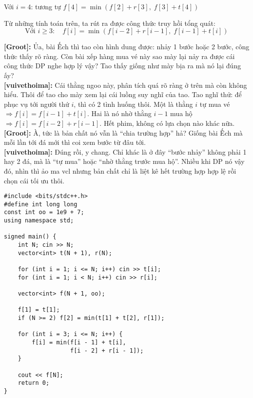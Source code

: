 Với $i = 4$: tương tự $f[4] = \min \left( f[2] + r[3], \; f[3] + t[4] \right)$

Từ những tính toán trên, ta rút ra được công thức truy hồi tổng quát:  
\[
\text{Với } i \geq 3: \quad f[i] = \min \left( f[i-2] + r[i-1], \; f[i-1] + t[i] \right)
\]


\textbf{[Groot]:} Ủa, bài Ếch thì tao còn hình dung được: nhảy 1 bước hoặc 2 bước, công thức thấy rõ ràng.  
Còn bài xếp hàng mua vé này sao mày lại nảy ra được cái công thức DP nghe hợp lý vậy? Tao thấy giống như mày bịa ra mà nó lại đúng ấy? \\

\textbf{[vuivethoima]:} Cái thằng ngoo này, phân tích quá rõ ràng ở trên mà còn không hiểu. Thôi để tao cho mày xem lại cái luồng suy nghĩ của tao. Tao nghĩ thử: để phục vụ tới người thứ $i$, thì có 2 tình huống thôi.  
Một là thằng $i$ tự mua vé $\Rightarrow f[i] = f[i-1] + t[i]$.  
Hai là nó nhờ thằng $i-1$ mua hộ $\Rightarrow f[i] = f[i-2] + r[i-1]$.  
Hết phim, không có lựa chọn nào khác nữa.\\

\textbf{[Groot]:} À, tức là bản chất nó vẫn là ``chia trường hợp'' hả? Giống bài Ếch mà mỗi lần tới đá mới thì coi xem bước từ đâu tới.\\

\textbf{[vuivethoima]:} Đúng rồi, y chang. Chỉ khác là ở đây ``bước nhảy'' không phải 1 hay 2 đá, mà là ``tự mua'' hoặc ``nhờ thằng trước mua hộ''. Nhiều khi DP nó vậy đó, nhìn thì ảo ma vcl nhưng bản chất chỉ là liệt kê hết trường hợp hợp lệ rồi chọn cái tối ưu thôi.

\begin{lstlisting}[title=\centering \textbf{Cài đặt}]
#include <bits/stdc++.h>
#define int long long
const int oo = 1e9 + 7;
using namespace std;

signed main() {
    int N; cin >> N;
    vector<int> t(N + 1), r(N);

    for (int i = 1; i <= N; i++) cin >> t[i];
    for (int i = 1; i < N; i++) cin >> r[i];

    vector<int> f(N + 1, oo);

    f[1] = t[1];
    if (N >= 2) f[2] = min(t[1] + t[2], r[1]);

    for (int i = 3; i <= N; i++) {
        f[i] = min(f[i - 1] + t[i],
                   f[i - 2] + r[i - 1]);
    }

    cout << f[N];
    return 0;
}
\end{lstlisting}


